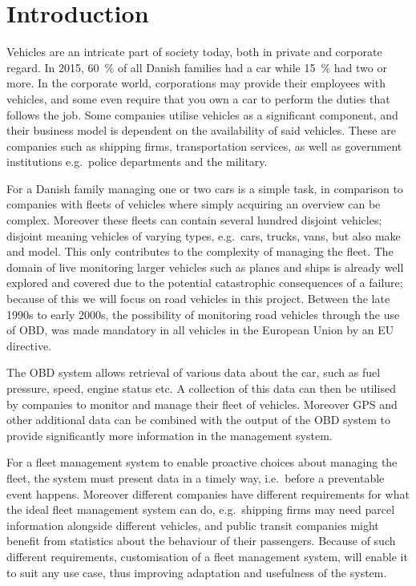 \chapter{Introduction}\label{cha:introduction}
Vehicles are an intricate part of society today, both in private and corporate regard.
In 2015, 60~\% of all Danish families had a car while 15~\% had two or more\cite{MoreCarsInFamilies}.
In the corporate world, corporations may provide their employees with vehicles,
and some even require that you own a car to perform the duties that follows the job.
Some companies utilise vehicles as a significant component,
and their business model is dependent on the availability of said vehicles.
These are companies such as shipping firms, transportation services,
as well as government institutions e.g.~police departments and the military.

\bigskip
For a Danish family managing one or two cars is a simple task,
in comparison to companies with fleets of vehicles where simply acquiring an overview can be complex.
Moreover these fleets can contain several hundred disjoint vehicles;
disjoint meaning vehicles of varying types, e.g.~cars, trucks, vans, but also make and model.
This only contributes to the complexity of managing the fleet.
The domain of live monitoring larger vehicles such as planes and ships is already well explored and covered
due to the potential catastrophic consequences of a failure;
because of this we will focus on road vehicles in this project.
Between the late 1990s to early 2000s, the possibility of monitoring road vehicles through the use of \acl{OBD},
was made mandatory in all vehicles in the European Union by an EU directive\cite{EUDirective}.

The \ac{OBD} system allows retrieval of various data about the car, such as fuel pressure, speed, engine status etc.
A collection of this data can then be utilised by companies to monitor and manage their fleet of vehicles.
Moreover GPS and other additional data can be combined with the output of the \ac{OBD} system
to provide significantly more information in the management system.

\bigskip
For a fleet management system to enable proactive choices about managing the fleet,
the system must present data in a timely way, i.e.~before a preventable event happens.
Moreover different companies have different requirements for what the ideal fleet management system can do,
e.g.~shipping firms may need parcel information alongside different vehicles,
and public transit companies might benefit from statistics about the behaviour of their passengers.
Because of such different requirements, customisation of a fleet management system,
will enable it to suit any use case, thus improving adaptation and usefulness of the system.

